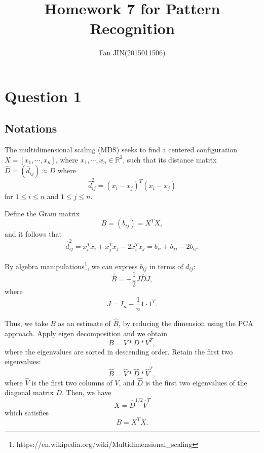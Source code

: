 \documentclass{article}
\begin{document}
\title{\textsf{Homework 7 for Pattern Recognition}}
\author{Fan JIN\quad (2015011506)}
\maketitle

\section*{Question 1}
{
    \subsection*{Notations}
    {
        The multidimensional scaling (MDS) seeks to find a centered configuration $X = [x_1, \cdots, x_n]$, 
        where $x_1, \cdots, x_n \in \mathbb{R}^2$, 
        such that its distance matrix $\hat{D} = (\hat{d}_{ij}) \approx D$ where $$\hat{d}_{ij}^2 = (x_i - x_j)^T (x_i - x_j)$$ for $1 \leq i \leq n$ and $1 \leq j \leq n$.

        Define the Gram matrix $$B = (b_{ij}) = X^T X,$$ 
        and it follows that $$\hat{d}_{ij}^2 = x_i^T x_i + x_j^T x_j - 2 x_i^T x_j = b_{ii} + b_{jj} - 2 b_{ij}.$$

        By algebra manipulations\footnote{https://en.wikipedia.org/wiki/Multidimensional\_scaling}, 
        we can express $b_{ij}$ in terms of $d_{ij}$:
        $$\hat{B} = -\frac{1}{2} J \hat{D} J,$$
        where $$J = I_n - \frac{1}{n} 1 \cdot 1^T.$$

        Thus, we take $B$ as an estimate of $\hat{B}$, by reducing the dimension using the PCA approach. 
        Apply eigen decomposition and we obtain
        $$B = V * D * V^T,$$ where the eigenvalues are sorted in descending order.
        Retain the first two eigenvalues:
        $$\hat{B} = \hat{V} * \hat{D} * \hat{V}^T,$$
        where $\hat{V}$ is the first two columns of $V$, and $\hat{D}$ is the first two eigenvalues of the diagonal matrix $D$. Then, we have
        $$X = \hat{D}^{1/2} \hat{V}^T$$ which satisfies $$B = X^T X.$$
    }

}
\end{document}

